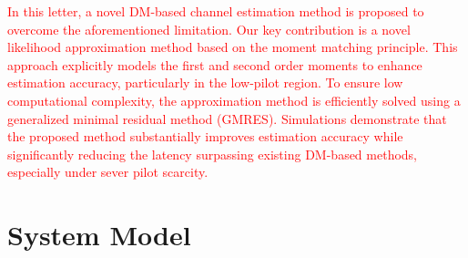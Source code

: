 \documentclass[lettersize,journal]{IEEEtran}
\newcommand{\tred}{\textcolor{red}}
\begin{document}
\tred{
In this letter, a novel DM-based channel estimation method is proposed to overcome the aforementioned limitation. Our key contribution is a novel likelihood approximation method based on the moment matching principle. This approach explicitly models the first and second order moments to enhance estimation accuracy, particularly in the low-pilot region. To ensure low computational complexity, the approximation method is efficiently solved using a generalized minimal residual method (GMRES). Simulations demonstrate that the proposed method substantially improves estimation accuracy while significantly reducing the latency surpassing existing DM-based methods, especially under sever pilot scarcity.
}

\section{System Model}
\end{document}
